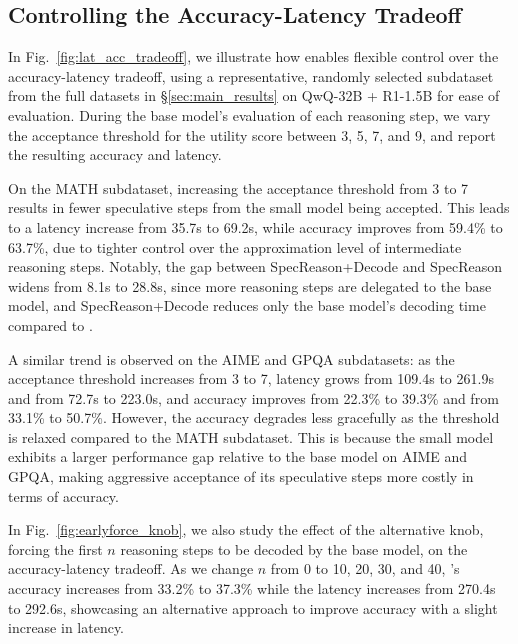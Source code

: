         
        





\subsection{Controlling the Accuracy-Latency Tradeoff}
\label{sec:acc_lat_tradeoff}

In Fig.~\ref{fig:lat_acc_tradeoff}, we illustrate how \name{} enables flexible control over the accuracy-latency tradeoff, using a representative, randomly selected subdataset from the full datasets in \S\ref{sec:main_results} on QwQ-32B + R1-1.5B for ease of evaluation. During the base model’s evaluation of each reasoning step, we vary the acceptance threshold for the utility score between 3, 5, 7, and 9, and report the resulting accuracy and latency.

On the MATH subdataset, increasing the acceptance threshold from 3 to 7 results in fewer speculative steps from the small model being accepted. This leads to a latency increase from 35.7s to 69.2s, while accuracy improves from 59.4\% to 63.7\%, due to tighter control over the approximation level of intermediate reasoning steps. Notably, the gap between SpecReason+Decode and SpecReason widens from 8.1s to 28.8s, since more reasoning steps are delegated to the base model, and SpecReason+Decode reduces only the base model’s decoding time compared to \name{}.

A similar trend is observed on the AIME and GPQA subdatasets: as the acceptance threshold increases from 3 to 7, latency grows from 109.4s to 261.9s and from 72.7s to 223.0s, and accuracy improves from 22.3\% to 39.3\% and from 33.1\% to 50.7\%. However, the accuracy degrades less gracefully as the threshold is relaxed compared to the MATH subdataset. This is because the small model exhibits a larger performance gap relative to the base model on AIME and GPQA, making aggressive acceptance of its speculative steps more costly in terms of accuracy.

In Fig.~\ref{fig:earlyforce_knob}, we also study the effect of the alternative knob, forcing the first $n$ reasoning steps to be decoded by the base model, on the accuracy-latency tradeoff. As we change $n$ from 0 to 10, 20, 30, and 40, \name{}'s accuracy increases from 33.2\% to 37.3\% while the latency increases from 270.4s to 292.6s, showcasing an alternative approach to improve accuracy with a slight increase in latency.









